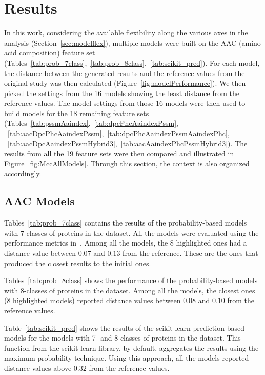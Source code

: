 \chapter{Results}
In this work, considering the available flexibility along the various axes in the analysis 
(Section~\ref{sec:modelflex}), multiple models were built on the AAC (amino acid composition) 
feature set (Tables~\ref{tab:prob_7class},~\ref{tab:prob_8class},~\ref{tab:scikit_pred}). 
For each model, the distance between the generated results and the reference values from 
the original study was then calculated (Figure~\ref{fig:modelPerformance}). We then picked 
the settings from the 16 models showing the least distance from the reference values. 
The model settings from those 16 models were then used to build models for the 18 
remaining feature sets (Tables~\ref{tab:pssmAaindex},~\ref{tab:dpcPhcAaindexPssm},
~\ref{tab:aacDpcPhcAaindexPssm},~\ref{tab:dpcPhcAaindexPssmAaindexPhc},
~\ref{tab:aacDpcAaindexPssmHybrid3},~\ref{tab:aacAaindexPhcPssmHybrid3}). 
The results from all the 19 feature sets were then compared and 
illustrated in Figure~\ref{fig:MccAllModels}. Through this section, the context is also 
organized accordingly.

\section{AAC Models}
Tables~\ref{tab:prob_7class} contains the results of the probability-based models with 
7-classes of proteins in the dataset. All the models were evaluated using the performance 
metrics in~\cite{mishra_prediction_2014}. Among all the models, the 8 highlighted ones had 
a distance value between $0.07$ and $0.13$ from the reference. These are the ones that produced 
the closest results to the initial ones.

Tables~\ref{tab:prob_8class} shows the performance of the probability-based models with 
8-classes of proteins in the dataset. Among all the models, the closest ones (8 highlighted models) 
reported distance values between $0.08$ and $0.10$ from the reference values. 

Table~\ref{tab:scikit_pred} shows the results of the scikit-learn prediction-based models 
for the models with 7- and 8-classes of proteins in the dataset. This function from the 
scikit-learn library, by default, aggregates the results using the maximum probability 
technique. Using this approach, all the models reported distance values above $0.32$ 
from the reference values.


